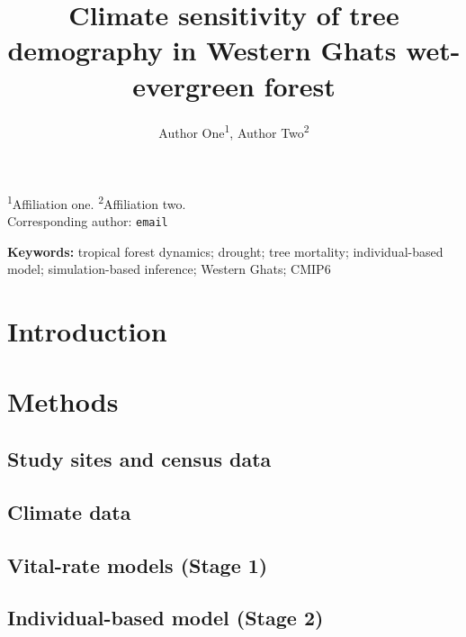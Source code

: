 \documentclass[11pt]{article}
\title{Climate sensitivity of tree demography in Western Ghats wet-evergreen forest}
\author{Author One\textsuperscript{1}, Author Two\textsuperscript{2}}
\date{}
\begin{document}
\maketitle

\noindent\textsuperscript{1}Affiliation one. \textsuperscript{2}Affiliation two.\\
Corresponding author: \texttt{email}

\begin{abstract}
\end{abstract}

\noindent\textbf{Keywords:} tropical forest dynamics; drought; tree mortality; individual-based model; simulation-based inference; Western Ghats; CMIP6

\section{Introduction}

\section{Methods}

\subsection{Study sites and census data}

\subsection{Climate data}

\subsection{Vital-rate models (Stage 1)}

\subsection{Individual-based model (Stage 2)}
\end{document}
